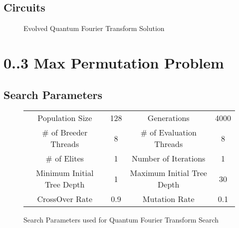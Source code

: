 \subsection{Circuits}
\label{sec:evoqftcir}
\begin{figure}
\caption{Evolved Quantum Fourier Transform Solution}
\label{fig:appevoqftsol}
\end{figure}

\clearpage
\section{0..3 Max Permutation Problem}
\label{sec:maxpermsol}

\subsection{Search Parameters}
\label{sec:qftsearchparams}

\begin{figure}[h!]
\begin{center}
 \begin{tabular}{|cc|cc|}
\hline
  Population Size & 128 & Generations & 4000 \\
  \# of Breeder Threads & 8 & \# of Evaluation Threads & 8 \\
  \# of Elites & 1 & Number of Iterations & 1 \\
  Minimum Initial Tree Depth & 1 & Maximum Initial Tree Depth & 30 \\
  CrossOver Rate & 0.9 & Mutation Rate & 0.1 \\
\hline
 \end{tabular}

\end{center}
\caption{Search Parameters used for Quantum Fourier Transform Search}
\label{fig:qftparams}
\end{figure}

